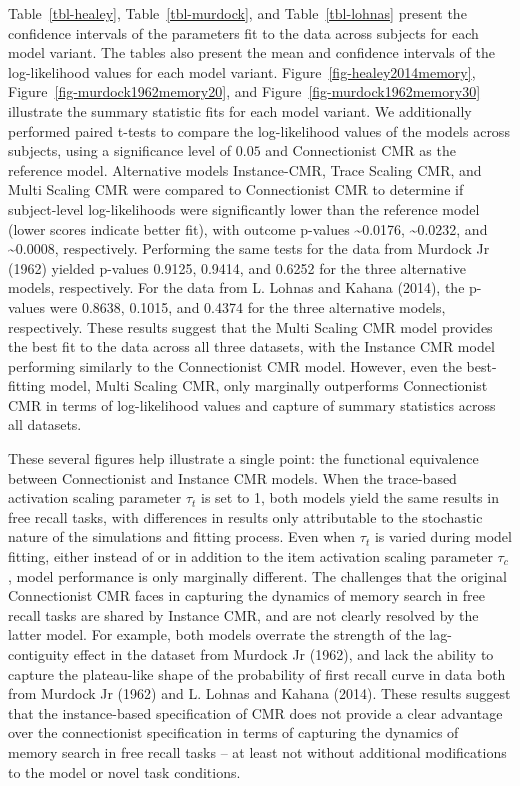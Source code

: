 \documentclass[
  letterpaper,
  11pt,
  english,
  singlespacing,
  headsepline]{MastersDoctoralThesis}
\begin{document}
Table~\ref{tbl-healey}, Table~\ref{tbl-murdock}, and
Table~\ref{tbl-lohnas} present the confidence intervals of the
parameters fit to the data across subjects for each model variant. The
tables also present the mean and confidence intervals of the
log-likelihood values for each model variant.
Figure~\ref{fig-healey2014memory}, Figure~\ref{fig-murdock1962memory20},
and Figure~\ref{fig-murdock1962memory30} illustrate the summary
statistic fits for each model variant. We additionally performed paired
t-tests to compare the log-likelihood values of the models across
subjects, using a significance level of \(0.05\) and Connectionist CMR
as the reference model. Alternative models Instance-CMR, Trace Scaling
CMR, and Multi Scaling CMR were compared to Connectionist CMR to
determine if subject-level log-likelihoods were significantly lower than
the reference model (lower scores indicate better fit), with outcome
p-values \textasciitilde0.0176, \textasciitilde0.0232, and
\textasciitilde0.0008, respectively. Performing the same tests for the
data from Murdock Jr (1962) yielded p-values 0.9125, 0.9414, and 0.6252
for the three alternative models, respectively. For the data from L.
Lohnas and Kahana (2014), the p-values were 0.8638, 0.1015, and 0.4374
for the three alternative models, respectively. These results suggest
that the Multi Scaling CMR model provides the best fit to the data
across all three datasets, with the Instance CMR model performing
similarly to the Connectionist CMR model. However, even the best-fitting
model, Multi Scaling CMR, only marginally outperforms Connectionist CMR
in terms of log-likelihood values and capture of summary statistics
across all datasets.

These several figures help illustrate a single point: the functional
equivalence between Connectionist and Instance CMR models. When the
trace-based activation scaling parameter \(\tau_{t}\) is set to 1, both
models yield the same results in free recall tasks, with differences in
results only attributable to the stochastic nature of the simulations
and fitting process. Even when \(\tau_{t}\) is varied during model
fitting, either instead of or in addition to the item activation scaling
parameter \(\tau_{c}\), model performance is only marginally different.
The challenges that the original Connectionist CMR faces in capturing
the dynamics of memory search in free recall tasks are shared by
Instance CMR, and are not clearly resolved by the latter model. For
example, both models overrate the strength of the lag-contiguity effect
in the dataset from Murdock Jr (1962), and lack the ability to capture
the plateau-like shape of the probability of first recall curve in data
both from Murdock Jr (1962) and L. Lohnas and Kahana (2014). These
results suggest that the instance-based specification of CMR does not
provide a clear advantage over the connectionist specification in terms
of capturing the dynamics of memory search in free recall tasks -- at
least not without additional modifications to the model or novel task
conditions.
\end{document}
